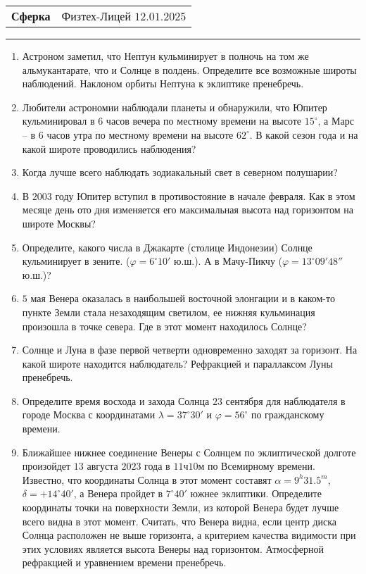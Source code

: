 \documentclass[12pt]{article}
\begin{document}
\begin{tabularx}{\textwidth}{Xr}
{\Large \textbf{Сферка}} & Физтех-Лицей $12.01.2025$ \\
\end{tabularx}
\noindent\rule{\textwidth}{0.4pt}
\begin{enumerate}
    \item{Астроном заметил, что Нептун кульминирует в полночь на том же альмукантарате, что и Солнце в полдень. Определите все возможные широты наблюдений. Наклоном орбиты Нептуна к эклиптике пренебречь.}
    \item{Любители астрономии наблюдали планеты и обнаружили, что Юпитер кульминировал в $6$ часов вечера по местному времени на высоте $15^{\circ}$, а Марс – в $6$ часов утра по местному времени на высоте $62^{\circ}$. В какой сезон года и на какой широте проводились наблюдения?}
    \item{Когда лучше всего наблюдать зодиакальный свет в северном полушарии?}
    \item{В $2003$ году Юпитер вступил в противостояние в начале февраля. Как в этом месяце день ото дня изменяется его максимальная высота над горизонтом на широте Москвы?}
    \item{Определите, какого числа в Джакарте (столице Индонезии) Солнце кульминирует в зените. ($\varphi=6^{\circ}10'$ ю.ш.). А в Мачу-Пикчу ($\varphi=13^{\circ}09'48''$ ю.ш.)?}
    \item{$5$ мая Венера оказалась в наибольшей восточной элонгации и в каком-то пункте Земли стала незаходящим светилом, ее нижняя кульминация произошла в точке севера. Где в этот момент находилось Солнце?}
    \item{Солнце и Луна в фазе первой четверти одновременно заходят за горизонт. На какой	широте находится наблюдатель? Рефракцией и параллаксом Луны пренебречь.}
    \item{Определите время восхода и захода Солнца $23$ сентября для наблюдателя в городе Москва с координатами $\lambda=37^{\circ}30'$ и $\varphi=56^{\circ}$ по гражданскому времени.}
    \item Ближайшее нижнее соединение Венеры с Солнцем по эклиптической долготе произойдет $13$ августа $2023$ года в $11$ч$10$м по Всемирному времени. Известно, что координаты Солнца в этот момент составят $\alpha = 9^h31.5^m$, $\delta = +14^{\circ}40'$, а Венера пройдет в $7^{\circ}40'$ южнее эклиптики. Определите координаты точки на поверхности Земли, из которой Венера будет лучше всего видна в этот момент. Считать, что Венера видна, если центр диска Солнца расположен не выше горизонта, а критерием качества видимости при этих условиях является высота Венеры над горизонтом. Атмосферной рефракцией и уравнением времени пренебречь.

\end{enumerate}
\end{document}
